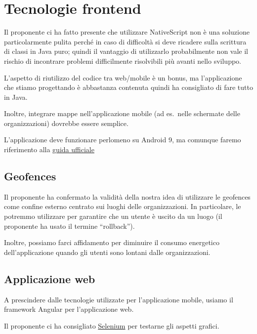 \documentclass{article}
\begin{document}

\section{Tecnologie frontend}%
\label{sec:tecnologie_frontend}

Il proponente ci ha fatto presente che utilizzare NativeScript non è una soluzione particolarmente pulita perché in caso di difficoltà si deve ricadere sulla scrittura di classi in Java puro;
quindi il vantaggio di utilizzarlo probabilmente non vale il rischio di incontrare problemi difficilmente risolvibili più avanti nello sviluppo.

L'aspetto di riutilizzo del codice tra web/mobile è un bonus, ma l'applicazione che stiamo progettando è abbastanza contenuta quindi ha consigliato di fare tutto in Java.

Inoltre, integrare mappe nell'applicazione mobile (ad es.\ nelle schermate delle organizzazioni) dovrebbe essere semplice.

L'applicazione deve funzionare perlomeno su Android 9, ma comunque faremo riferimento alla \href{https://developer.android.com/distribute/best-practices/develop/target-sdk}{guida ufficiale}

\subsection{Geofences}%
\label{sub:geofences}

Il proponente ha confermato la validità della nostra idea di utilizzare le geofences come confine esterno centrato sui luoghi delle organizzazioni.
In particolare, le potremmo utilizzare per garantire che un utente è uscito da un luogo (il proponente ha usato il termine ``rollback'').

Inoltre, possiamo farci affidamento per diminuire il consumo energetico dell'applicazione quando gli utenti sono lontani dalle organizzazioni.


\subsection{Applicazione web}%
\label{sub:applicazione_web}

A prescindere dalle tecnologie utilizzate per l'applicazione mobile, usiamo il framework Angular per l'applicazione web.

Il proponente ci ha consigliato \href{https://www.selenium.dev/}{Selenium} per testarne gli aspetti grafici.
\end{document}
